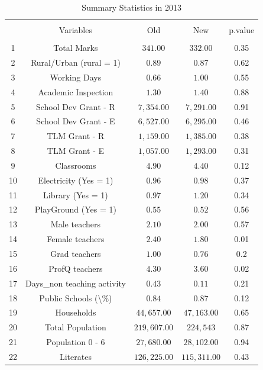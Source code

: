 \documentclass[12pt, a4paper]{article}
\begin{document}
	\begin{table}[!htbp] \centering 
		\caption{Summary Statistics in 2013} 
		\label{} 
		\begin{tabular}{@{\extracolsep{5pt}} ccccc} 
			\\[-1.8ex]\hline 
			\hline \\[-1.8ex] 
			& Variables & Old & New & p.value \\ 
			\hline \\[-1.8ex] 
			1 & Total Marks & $341.00$ & $332.00$ & 0.35 \\ 
			2 & Rural/Urban (rural = 1) & $0.89$ & $0.87$ & 0.62 \\ 
			3 & Working Days & $0.66$ & $1.00$ & 0.55 \\ 
			4 & Academic Inspection & $1.30$ & $1.40$ & 0.88 \\ 
			5 & School Dev Grant - R & $7,354.00$ & $7,291.00$ & 0.91 \\ 
			6 & School Dev Grant - E & $6,527.00$ & $6,295.00$ & 0.46 \\ 
			7 & TLM Grant - R & $1,159.00$ & $1,385.00$ & 0.38 \\ 
			8 & TLM Grant - E & $1,057.00$ & $1,293.00$ & 0.31 \\ 
			9 & Classrooms & $4.90$ & $4.40$ & 0.12 \\ 
			10 & Electricity (Yes = 1) & $0.96$ & $0.98$ & 0.37 \\ 
			11 & Library  (Yes = 1) & $0.97$ & $1.20$ & 0.34 \\ 
			12 & PlayGround  (Yes = 1) & $0.55$ & $0.52$ & 0.56 \\ 
			13 & Male teachers & $2.10$ & $2.00$ & 0.57 \\ 
			14 & Female teachers & $2.40$ & $1.80$ & 0.01 \\ 
			15 & Grad teachers & $1.00$ & $0.76$ & 0.2 \\ 
			16 & ProfQ teachers & $4.30$ & $3.60$ & 0.02 \\ 
			17 & Days\_non teaching activity & $0.43$ & $0.11$ & 0.21 \\ 
			18 & Public Schools (\textbackslash \%) & $0.84$ & $0.87$ & 0.12 \\ 
			19 & Households & $44,657.00$ & $47,163.00$ & 0.65 \\ 
			20 & Total Population & $219,607.00$ & $224,543$ & 0.87 \\ 
			21 & Population 0 - 6 & $27,680.00$ & $28,102.00$ & 0.94 \\ 
			22 & Literates & $126,225.00$ & $115,311.00$ & 0.43 \\ 

\end{tabular}
\end{table}
\end{document}
